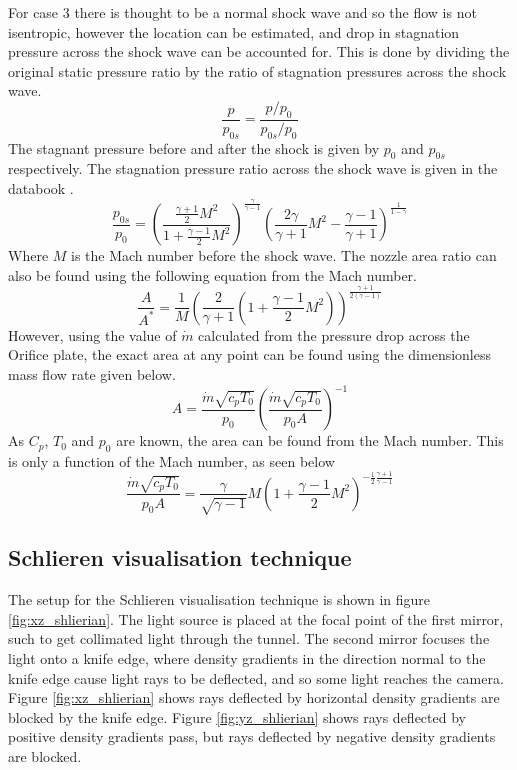 \documentclass{article}
\begin{document}
For case 3 there is thought to be a normal shock wave and so the flow is not isentropic, however the location can be estimated, and drop in stagnation pressure across the shock wave can be accounted for.
This is done by dividing the original static pressure ratio by the ratio of stagnation pressures across the shock wave.
\begin{equation}
    \frac{p}{p_{0s}} = \frac{p/p_0}{p_{0s}/p_0}
\end{equation}
The stagnant pressure before and after the shock is given by $p_0$ and $p_{0s}$ respectively.
The stagnation pressure ratio across the shock wave is given in the databook \cite{data_book}.
\begin{equation}
    \frac{p_{0s}}{p_0} = \left( \frac{\frac{\gamma+1}{2}M^2}{1 + \frac{\gamma-1}{2}M^2}\right) ^ \frac{\gamma}{\gamma-1} \left( \frac{2\gamma}{\gamma+1} M^2 - \frac{\gamma-1}{\gamma+1}\right) ^ \frac{1}{1 - \gamma}
\end{equation}
Where $M$ is the Mach number before the shock wave.
The nozzle area ratio can also be found using the following equation from the Mach number.
\begin{equation}
    \frac{A}{A^*} = \frac{1}{M} \left( \frac{2}{\gamma+1} \left( 1 + \frac{\gamma-1}{2}M^2\right) \right) ^ {\frac{\gamma+1}{2(\gamma-1)}}
\end{equation}
However, using the value of $\dot{m}$ calculated from the pressure drop across the Orifice plate, the exact area at any point can be found using the dimensionless mass flow rate given below.
\begin{equation}
    A = \frac{\dot{m}\sqrt{c_pT_0}}{p_0} \left( \frac{\dot{m}\sqrt{c_pT_0}}{p_0A} \right)^{-1}
    \label{eqn:area}
\end{equation}
As $C_p$, $T_0$ and $p_0$ are known, the area can be found from the Mach number.
This is only a function of the Mach number, as seen below
\begin{equation}
    \frac{\dot{m}\sqrt{c_pT_0}}{p_0A} = \frac{\gamma}{\sqrt{\gamma-1}} M \left(1 + \frac{\gamma - 1}{2} M^2 \right) ^ {- \frac{1}{2}\frac{\gamma + 1}{\gamma - 1}} 
\end{equation}

\subsection{Schlieren visualisation technique}

The setup for the Schlieren visualisation technique is shown in figure \ref{fig:xz_shlierian}.
The light source is placed at the focal point of the first mirror, such to get collimated light through the tunnel.
The second mirror focuses the light onto a knife edge, where density gradients in the direction normal to the knife edge cause light rays to be deflected, and so some light reaches the camera.
Figure \ref{fig:xz_shlierian} shows rays deflected by horizontal density gradients are blocked by the knife edge.
Figure \ref{fig:yz_shlierian} shows rays deflected by positive density gradients pass, but rays deflected by negative density gradients are blocked.
\end{document}
